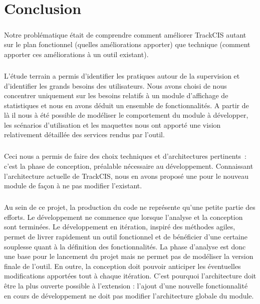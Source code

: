 \chapter*{Conclusion}
	\paragraph{}
	Notre problématique était de comprendre comment améliorer TrackCIS autant sur
	le plan fonctionnel (quelles améliorations apporter) que technique (comment
	apporter ces améliorations à un outil existant).
	
	\paragraph{}%
	L'étude terrain a permis d'identifier les pratiques autour de la supervision et
	d'identifier les grands besoins des utilisateurs. Nous avons choisi de nous
	concentrer uniquement sur les besoins relatifs à un module d'affichage de
	statistiques et nous en avons déduit un ensemble de fonctionnalités. A partir
	de là il nous à été possible de modéliser le comportement du module à
	développer, les scénarios d'utilisation et les maquettes nous ont apporté une
	vision relativement détaillée des services rendus par l'outil.
	
	\paragraph{}%
	Ceci nous a permis de faire des choix techniques et
	d'architectures pertinents~: c'est la phase de
	conception, préalable nécessaire au développement.
	Connaissant l'architecture actuelle de
	TrackCIS, nous en avons proposé une pour le nouveau module de façon à ne pas
	modifier l'existant.
	
	\paragraph{}%
	Au sein de ce projet, la production du code ne représente qu'une petite
	partie des efforts. Le développement ne commence que lorsque l'analyse et la
	conception sont terminées. Le développement en itération, inspiré des
	méthodes agiles, permet de livrer rapidement un outil fonctionnel et de
	bénéficier d'une certaine souplesse quant à la définition des fonctionnalités.
	La phase d'analyse est donc une base pour le lancement du projet mais ne
	permet pas de modéliser la version finale de l'outil. En outre, la
	conception doit pouvoir anticiper les éventuelles modifications apportées tout
	à chaque itération. C'est pourquoi l'architecture doit être la plus ouverte
	possible à l'extension :
	l'ajout d'une nouvelle fonctionnalité en cours de développement ne doit pas
	modifier l'architecture globale du module.
	
